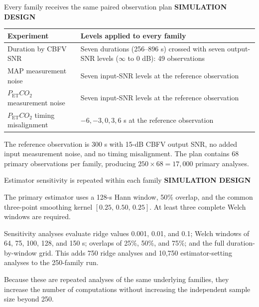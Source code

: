 \documentclass[aspectratio=169,11pt]{beamer}
\newcommand{\PETCOtwo}{P_{\mathrm{ET}}CO_2}
\newcommand{\sectionlabel}[1]{%
  {\color{Accent}\fontsize{8}{9.5}\selectfont\bfseries\MakeUppercase{#1}}\par\vspace{0.12cm}}
\begin{document}
\begin{frame}{Every family receives the same paired observation plan}
\sectionlabel{Simulation Design}
\fontsize{10.2}{12.7}\selectfont
\begin{tabular}{p{}p{}}
\toprule
\textbf{Experiment} & \textbf{Levels applied to every family}\\
\midrule
Duration by CBFV SNR & Seven durations (256--896 s) crossed with seven output-SNR levels ($\infty$ to 0 dB): 49 observations\\
MAP measurement noise & Seven input-SNR levels at the reference observation\\
$\PETCOtwo$ measurement noise & Seven input-SNR levels at the reference observation\\
$\PETCOtwo$ timing misalignment & $-6,-3,0,3,6$ s at the reference observation\\
\bottomrule
\end{tabular}

\vspace{0.32cm}
The reference observation is 300 s with 15-dB CBFV output SNR, no added input
measurement noise, and no timing misalignment. The plan contains 68 primary
observations per family, producing $250\times68=17{,}000$ primary analyses.
\end{frame}

\begin{frame}{Estimator sensitivity is repeated within each family}
\sectionlabel{Simulation Design}
The primary estimator uses a 128-s Hann window, 50\% overlap, and the common
three-point smoothing kernel $[0.25,\,0.50,\,0.25]$. At least three complete
Welch windows are required.

\vspace{0.40cm}
Sensitivity analyses evaluate ridge values 0.001, 0.01, and 0.1; Welch windows
of 64, 75, 100, 128, and 150 s; overlaps of 25\%, 50\%, and 75\%; and the full
duration-by-window grid. This adds 750 ridge analyses and 10,750 estimator-setting
analyses to the 250-family run.

\vspace{0.40cm}
Because these are repeated analyses of the same underlying families, they
increase the number of computations without increasing the independent sample
size beyond 250.
\end{frame}
\end{document}
